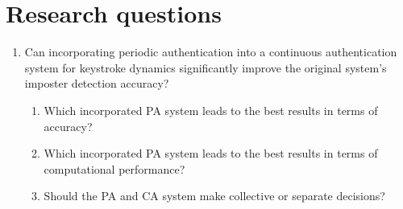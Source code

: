 \documentclass[informationsecurity]{gucmasterproject}
\begin{document}
\section{Research questions}\label{research:questions}
\begin{enumerate}
\item Can incorporating periodic authentication into a continuous authentication system for keystroke
dynamics significantly improve the original system's imposter detection accuracy?
\begin{enumerate}
\item Which incorporated PA system leads to the best results in terms of accuracy?
\item Which incorporated PA system leads to the best results in terms of computational performance?
\item Should the PA and CA system make collective or separate decisions?
\end{enumerate}
\end{enumerate}
%
\end{document}
